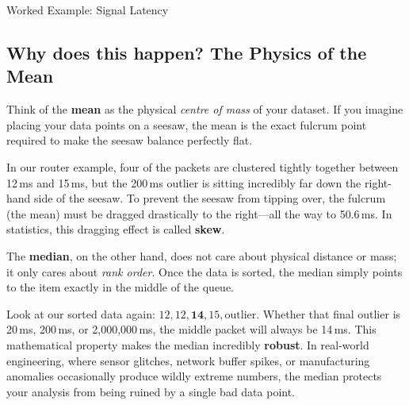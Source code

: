 \begin{frame}[allowframebreaks]{Worked Example: Signal Latency}
{    \subsection{Why does this happen? The Physics of the Mean} 
    Think of the \textbf{mean} as the physical \textit{centre of mass} of your dataset. If you imagine placing your data points on a seesaw, the mean is the exact fulcrum point required to make the seesaw balance perfectly flat. 
    
    In our router example, four of the packets are clustered tightly together between 12\,ms and 15\,ms, but the 200\,ms outlier is sitting incredibly far down the right-hand side of the seesaw. To prevent the seesaw from tipping over, the fulcrum (the mean) must be dragged drastically to the right—all the way to 50.6\,ms. In statistics, this dragging effect is called \textbf{skew}.
    
    
    
    The \textbf{median}, on the other hand, does not care about physical distance or mass; it only cares about \textit{rank order}. Once the data is sorted, the median simply points to the item exactly in the middle of the queue. 
    
    Look at our sorted data again: $12, 12, \mathbf{14}, 15, \text{outlier}$. 
    Whether that final outlier is 20\,ms, 200\,ms, or 2,000,000\,ms, the middle packet will always be 14\,ms. This mathematical property makes the median incredibly \textbf{robust}. In real-world engineering, where sensor glitches, network buffer spikes, or manufacturing anomalies occasionally produce wildly extreme numbers, the median protects your analysis from being ruined by a single bad data point.
}
\end{frame}


